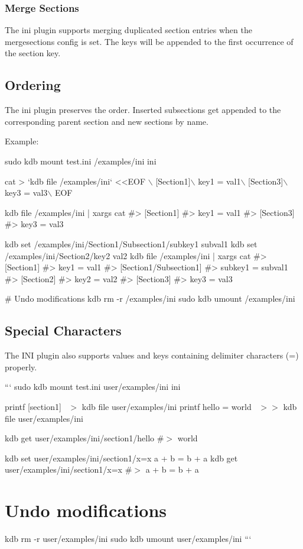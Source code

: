 \subsubsection*{Merge Sections}

The ini plugin supports merging duplicated section entries when the {\ttfamily mergesections} config is set. The keys will be appended to the first occurrence of the section key.

\subsection*{Ordering}

The ini plugin preserves the order. Inserted subsections get appended to the corresponding parent section and new sections by name.

Example\+:


\begin{DoxyCode}
sudo kdb mount test.ini /examples/ini ini

cat > `kdb file /examples/ini` <<EOF \(\backslash\)
[Section1]\(\backslash\)
key1 = val1\(\backslash\)
[Section3]\(\backslash\)
key3 = val3\(\backslash\)
EOF

kdb file /examples/ini | xargs cat
#> [Section1]
#> key1 = val1
#> [Section3]
#> key3 = val3

kdb set /examples/ini/Section1/Subsection1/subkey1 subval1
kdb set /examples/ini/Section2/key2 val2
kdb file /examples/ini | xargs cat
#> [Section1]
#> key1 = val1
#> [Section1/Subsection1]
#> subkey1 = subval1
#> [Section2]
#> key2 = val2
#> [Section3]
#> key3 = val3

# Undo modifications
kdb rm -r /examples/ini
sudo kdb umount /examples/ini
\end{DoxyCode}


\subsection*{Special Characters}

The I\+NI plugin also supports values and keys containing delimiter characters ({\ttfamily =}) properly.

``` sudo kdb mount test.\+ini user/examples/ini ini

printf \textquotesingle{}\mbox{[}section1\mbox{]}~\newline
\textquotesingle{} $>$ {\ttfamily kdb file user/examples/ini} printf \textquotesingle{}hello = world~\newline
\textquotesingle{} $>$$>$ {\ttfamily kdb file user/examples/ini}

kdb get user/examples/ini/section1/hello \#$>$ world

kdb set user/examples/ini/section1/x=x \textquotesingle{}a + b = b + a\textquotesingle{} kdb get user/examples/ini/section1/x=x \#$>$ a + b = b + a

\section*{Undo modifications}

kdb rm -\/r user/examples/ini sudo kdb umount user/examples/ini ``` 